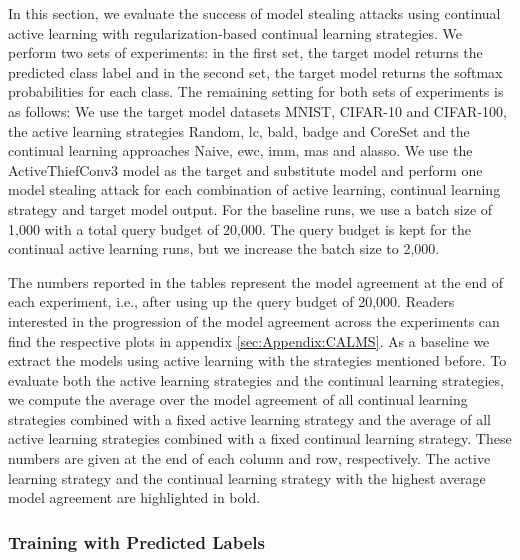 In this section, we evaluate the success of model stealing attacks using continual active learning with regularization-based continual learning strategies. 
We perform two sets of experiments: in the first set, the target model returns the predicted class label and in the second set, the target model returns the
softmax probabilities for each class. The remaining setting for both sets of experiments is as follows: We use the target model datasets MNIST, CIFAR-10 and CIFAR-100,
the active learning strategies Random, \gls{lc}, \gls{bald}, \gls{badge} and CoreSet and the continual learning approaches Naive, \gls{ewc}, \gls{imm}, \gls{mas} and
\gls{alasso}. We use the ActiveThiefConv3 model as the target and substitute model and perform one model stealing attack for each combination of active learning,
continual learning strategy and target model output. For the baseline runs, we use a batch size of 1,000 with a total query budget of 20,000. The query budget is kept
for the continual active learning runs, but we increase the batch size to 2,000. \par
The numbers reported in the tables represent the model agreement at the end of each experiment, i.e., after using up the query budget of 20,000. Readers interested
in the progression of the model agreement across the experiments can find the respective plots in appendix \ref{sec:Appendix:CALMS}. As a baseline we extract the models
using active learning with the strategies mentioned before. To evaluate both the active learning strategies and the continual learning strategies, we compute the average
over the model agreement of all continual learning strategies combined with a fixed active learning strategy and the average of all active learning strategies combined
with a fixed continual learning strategy. These numbers are given at the end of each column and row, respectively. The active learning strategy and the continual
learning strategy with the highest average model agreement are highlighted in bold. \par


\subsubsection{Training with Predicted Labels}
\label{sec:Evaluation:MS:Regularization:Predicted}

